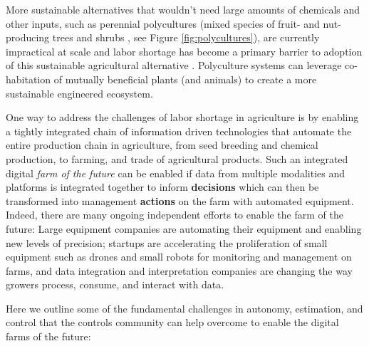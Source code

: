 More sustainable alternatives that wouldn't need large amounts of chemicals and other inputs, such as perennial polycultures (mixed species of fruit- and nut-producing trees and shrubs \cite{lovell2017temperate}, see Figure \ref{fig:polycultures}), are currently impractical at scale and labor shortage has become a primary barrier to adoption of this sustainable agricultural alternative \cite{RN4017,RN4018}. Polyculture systems can leverage co-habitation of mutually beneficial plants (and  animals) to create a more sustainable engineered ecosystem. %


One way to address the challenges of labor shortage in agriculture is by enabling a tightly integrated chain of information driven technologies that automate the entire production ​chain in agriculture, from seed breeding and chemical production, to farming, and trade of agricultural products. Such an integrated ​digital\textit{ farm of the future} can be enabled if ​data from multiple modalities and platforms is integrated together​ to inform \textbf{​decisions} which can then be transformed into management \textbf{​actions} on the farm with automated equipment. Indeed, there are many ongoing independent efforts to enable the farm of the future: Large equipment companies are automating their equipment and enabling new levels of precision; startups are accelerating the proliferation of small equipment such as drones and small robots for monitoring and management on farms, and data integration and interpretation companies are changing the way growers process, consume, and interact with data.

Here we outline some of the fundamental challenges in autonomy, estimation, and control that the controls community can help overcome to enable the digital farms of the future:

